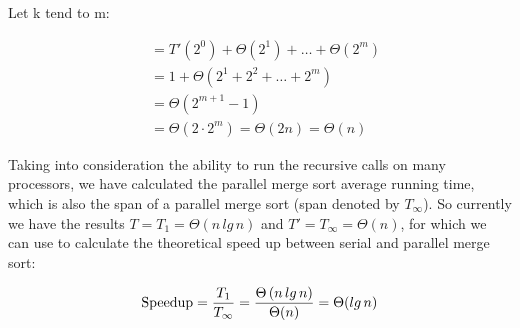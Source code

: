 \documentclass[12pt,twoside,notitlepage]{report}
\begin{document}
Let k tend to m:

\begin{align*}
&= T'\left(2^{0}\right) + \Theta\left(2^{1}\right) + \ldots + \Theta\left(2^{m}\right) \\
&= 1 + \Theta\left(2^{1} + 2^{2} + \ldots + 2^{m}\right) \\
&= \Theta\left(2^{m+1} - 1\right) \\
&= \Theta\left(2\cdot2^{m}\right)
= \Theta\left(2n\right)
= \Theta\left(n\right)
\end{align*}

Taking into consideration the ability to run the recursive calls on many processors, we have calculated the parallel merge sort average running time, which is also the span of a parallel merge sort (span denoted by $T_\infty$). So
currently we have the results $T = T_{1} = \Theta(n\,lg\,n)$ and $T' = T_{\infty} = \Theta(n)$, for which we can use to calculate the theoretical speed up between serial and parallel merge sort:

\begin{align*}
\text{Speedup} = {T_{1} \over T_{\infty}} = {\Theta\left(n\,lg\,n\right) \over \Theta(n)} = \Theta(lg\,n)
\end{align*}
\end{document}
